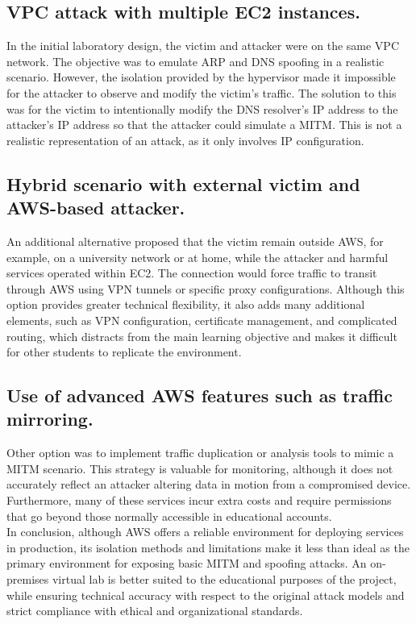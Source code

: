 \documentclass[conference]{IEEEtran}
\begin{document}
\subsection{VPC attack with multiple EC2 instances.}
In the initial laboratory design, the victim and attacker were on the same VPC network. The objective was to emulate ARP and DNS spoofing in a realistic scenario. However, the isolation provided by the hypervisor made it impossible for the attacker to observe and modify the victim's traffic. The solution to this was for the victim to intentionally modify the DNS resolver's IP address to the attacker's IP address so that the attacker could simulate a MITM. This is not a realistic representation of an attack, as it only involves IP configuration.

\subsection{Hybrid scenario with external victim and AWS-based attacker.}
An additional alternative proposed that the victim remain outside AWS, for example, on a university network or at home, while the attacker and harmful services operated within EC2. The connection would force traffic to transit through AWS using VPN tunnels or specific proxy configurations. Although this option provides greater technical flexibility, it also adds many additional elements, such as VPN configuration, certificate management, and complicated routing, which distracts from the main learning objective and makes it difficult for other students to replicate the environment.

\subsection{Use of advanced AWS features such as traffic mirroring.}

Other option was to implement traffic duplication or analysis tools to mimic a MITM scenario. This strategy is valuable for monitoring, although it does not accurately reflect an attacker altering data in motion from a compromised device.  Furthermore, many of these services incur extra costs and require permissions that go beyond those normally accessible in educational accounts.\\

In conclusion, although AWS offers a reliable environment for deploying services in production, its isolation methods and limitations make it less than ideal as the primary environment for exposing basic MITM and spoofing attacks.  An on-premises virtual lab is better suited to the educational purposes of the project, while ensuring technical accuracy with respect to the original attack models and strict compliance with ethical and organizational standards.
\end{document}
